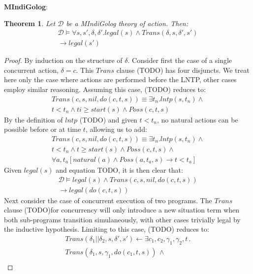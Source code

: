 \documentclass[letterpaper]{article}
\newtheorem{theorem}{Theorem}
\begin{document}
\textbf{MIndiGolog}:   

\begin{theorem}
Let $\mathcal{D}$ be a MIndiGolog theory of action. Then:
\begin{multline*}
\mathcal{D} \models \forall s,s',\delta,\delta'.legal(s)\wedge Trans(\delta,s,\delta',s')\\
\rightarrow legal(s')
\end{multline*}
\end{theorem}

\begin{proof}
By induction on the structure of $\delta$.
Consider first the case of a single concurrent action, $\delta=c$.  This
$Trans$ clause (TODO) has four disjuncts. We treat here only the
case where actions are performed before the LNTP, other
cases employ similar reasoning.
Assuming this case, (TODO) reduces to:
\begin{multline*}
Trans(c,s,nil,do(c,t,s)) \equiv \exists t_n . lntp(s,t_n) \wedge \\
  t < t_n \wedge ti \geq start(s) \wedge Poss(c,t,s)
\end{multline*}
By the definition of $lntp$ (TODO) and given $t < t_n$, no natural actions
can be possible before or at time $t$, allowing us to add:
\begin{multline*}
Trans(c,s,nil,do(c,t,s)) \equiv \exists t_n . lntp(s,t_n) \wedge \\
  t < t_n \wedge t \geq start(s) \wedge Poss(c,t,s) \wedge\\
  \forall a,t_a \left[ natural(a) \wedge Poss(a,t_a,s) \rightarrow t < t_a \right]
\end{multline*}
Given $legal(s)$ and equation TODO, it is then clear that:
\begin{multline*}
\mathcal{D} \models legal(s) \wedge Trans(c,s,nil,do(c,t,s))\\
\rightarrow legal(do(c,t,s))
\end{multline*}
Next consider the case of concurrent execution of two programs.  The $Trans$
clause (TODO)for concurrency will only introduce a new situation term when both
sub-programs transition simulaneously, with other cases trivially legal by
the inductive hypothesis.  Limiting to this case, (TODO) reduces to:
\begin{multline*}
Trans(\delta_{1}||\delta_{2},s,\delta',s')\leftarrow \exists c_{1},c_{2},\gamma_{1},\gamma_{2},t\,.\\
Trans(\delta_{1},s,\gamma_{1},do(c_{1},t,s))\,\wedge\\

\end{multline*}
\end{proof}
\end{document}
